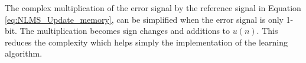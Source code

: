 \documentclass[conference]{IEEEtran}
\begin{document}
The complex multiplication of the error signal by the reference signal in Equation \ref{eq:NLMS_Update_memory}, can be simplified when the error signal is only 1-bit. The multiplication becomes sign changes and additions to $u(n)$. This reduces the complexity which helps simply the implementation of the learning algorithm. 


%
%



%
%
\end{document}
